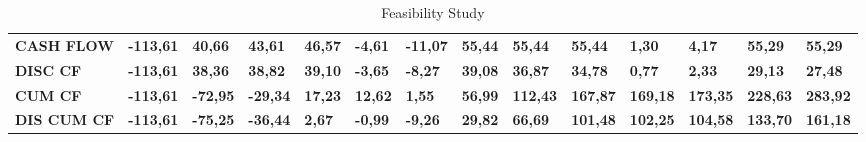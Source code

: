\begin{landscape}
\begin{table}[]
{\begin{tabular}{|l|l|l|l|l|l|l|l|l|l|l|l|l|l|}
\\ \hline \hline
\rowcolor[gray]{0.85}
\textbf{CASH FLOW}                                                                     & \textbf{-113,61} & \textbf{40,66}  & \textbf{43,61}  & \textbf{46,57}  & \textbf{-4,61}  & \textbf{-11,07} & \textbf{55,44}  & \textbf{55,44}  & \textbf{55,44}  & \textbf{1,30}   & \textbf{4,17}    & \textbf{55,29}   & \textbf{55,29}   \\
\rowcolor[gray]{0.85}
\textbf{DISC CF}                                                                       & \textbf{-113,61} & \textbf{38,36}  & \textbf{38,82}  & \textbf{39,10}  & \textbf{-3,65}  & \textbf{-8,27}  & \textbf{39,08}  & \textbf{36,87}  & \textbf{34,78}  & \textbf{0,77}   & \textbf{2,33}    & \textbf{29,13}   & \textbf{27,48}   \\
\rowcolor[gray]{0.85}
\textbf{CUM CF}                                                                        & \textbf{-113,61} & \textbf{-72,95} & \textbf{-29,34} & \textbf{17,23}  & \textbf{12,62}  & \textbf{1,55}   & \textbf{56,99}  & \textbf{112,43} & \textbf{167,87} & \textbf{169,18} & \textbf{173,35}  & \textbf{228,63}  & \textbf{283,92}  \\
\rowcolor[gray]{0.85}
\textbf{DIS CUM CF}                                                                    & \textbf{-113,61} & \textbf{-75,25} & \textbf{-36,44} & \textbf{2,67}   & \textbf{-0,99}  & \textbf{-9,26}  & \textbf{29,82}  & \textbf{66,69}  & \textbf{101,48} & \textbf{102,25} & \textbf{104,58}  & \textbf{133,70}  & \textbf{161,18} 
\\ \hline
\end{tabular}
}
\vspace*{\fill}
\caption{Feasibility Study}
\label{Feasibility Study}
\end{table}
\end{landscape}
\restoregeometry